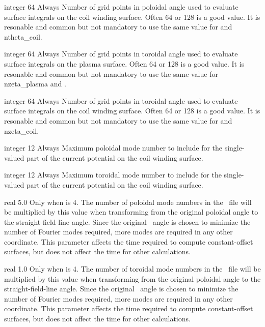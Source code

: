 \myhrule

{integer}
{64}
{Always}
{Number of grid points in poloidal angle used to evaluate surface integrals on the coil winding surface.
Often 64 or 128 is a good value.
It is resonable and common but not mandatory to use the same value for  and {\ttfamily ntheta\_coil}.}

\myhrule


{integer}
{64}
{Always}
{Number of grid points in toroidal angle used to evaluate surface integrals on the plasma surface.
Often 64 or 128 is a good value.
It is resonable and common but not mandatory to use the same value for {\ttfamily nzeta\_plasma} and .}

\myhrule

{integer}
{64}
{Always}
{Number of grid points in toroidal angle used to evaluate surface integrals on the coil winding surface.
Often 64 or 128 is a good value.
It is resonable and common but not mandatory to use the same value for  and {\ttfamily nzeta\_coil}.}

\myhrule

{integer}
{12}
{Always}
{Maximum poloidal mode number to include for the single-valued part of the current potential on the coil winding surface.
}

\myhrule

{integer}
{12}
{Always}
{
Maximum toroidal mode number to include for the single-valued part of the current potential on the coil winding surface.
}

\myhrule

{real}
{5.0}
{Only when  is 4.}
{The number of poloidal mode numbers in the \vmec~file will be multiplied by this value
when transforming from the original poloidal angle to the straight-field-line angle.
Since the original \vmec~angle is chosen to minimize the number of Fourier modes required,
more modes are required in any other coordinate.
This parameter affects the time required to compute constant-offset surfaces,
but does not affect the time for other calculations.
}

\myhrule

{real}
{1.0}
{Only when  is 4.}
{The number of toroidal mode numbers in the \vmec~file will be multiplied by this value
when transforming from the original poloidal angle to the straight-field-line angle.
Since the original \vmec~angle is chosen to minimize the number of Fourier modes required,
more modes are required in any other coordinate.
This parameter affects the time required to compute constant-offset surfaces,
but does not affect the time for other calculations.
}

